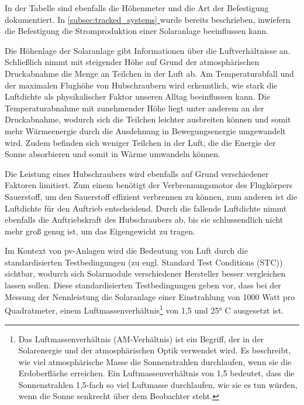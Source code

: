 \documentclass[12pt, a4paper]{article}
\newcommand*{\fullref}[1]{\hyperref[{#1}]{\autoref*{#1} \textit{\nameref*{#1}}}}
\begin{document}
In der Tabelle sind ebenfalls die Höhenmeter und die Art der Befestigung dokumentiert. In \fullref{subsec:tracked_systems} wurde bereits beschrieben, inwiefern die Befestigung die Stromproduktion einer Solaranlage beeinflussen kann. 

Die Höhenlage der Solaranlage gibt Informationen über die Luftverhältnisse an. Schließlich nimmt mit steigender Höhe auf Grund der atmosphärischen Druckabnahme die Menge an Teilchen in der Luft ab. Am Temperaturabfall und der maximalen Flughöhe von Hubschraubern wird erkenntlich, wie stark die Luftdichte als physikalischer Faktor unseren Alltag beeinflussen kann. Die Temperaturabnahme mit zunehmender Höhe liegt unter anderem an der Druckabnahme, wodurch sich die Teilchen leichter ausbreiten können und somit mehr Wärmeenergie durch die Ausdehnung in Bewegungsenergie umgewandelt wird. Zudem befinden sich weniger Teilchen in der Luft, die die Energie der Sonne absorbieren und somit in Wärme umwandeln können.


Die Leistung eines Hubschraubers wird ebenfalls auf Grund verschiedener Faktoren limitiert. Zum einem benötigt der Verbrennungsmotor des Flugkörpers Sauerstoff, um den Sauerstoff effizient verbrennen zu können, zum anderen ist die Luftdichte für den Auftrieb entscheidend. Durch die fallende Luftdichte nimmt ebenfalls die Auftriebskraft des Hubschraubers ab, bis sie schlussendlich nicht mehr groß genug ist, um das Eigengewicht zu tragen.

Im Kontext von \ac{pv}-Anlagen wird die Bedeutung von Luft durch die standardisierten Testbedingungen (zu engl. Standard Test Conditions (STC)) sichtbar, wodurch sich Solarmodule verschiedener Hersteller besser vergleichen lassen sollen. Diese standardisierten Testbedingungen geben vor, dass bei der Messung der Nennleistung die Solaranlage einer Einstrahlung von 1000 Watt pro Quadratmeter, einem Luftmassenverhältnis\footnote{Das Luftmassenverhältnis (AM-Verhältnis) ist ein Begriff, der in der Solarenergie und der atmosphärischen Optik verwendet wird. Es beschreibt, wie viel atmosphärische Masse die Sonnenstrahlen durchlaufen, wenn sie die Erdoberfläche erreichen. Ein Luftmassenverhältnis von 1,5 bedeutet, dass die Sonnenstrahlen 1,5-fach so viel Luftmasse durchlaufen, wie sie es tun würden, wenn die Sonne senkrecht über dem Beobachter steht.} von 1,5 und 25° C ausgesetzt ist.
\end{document}
